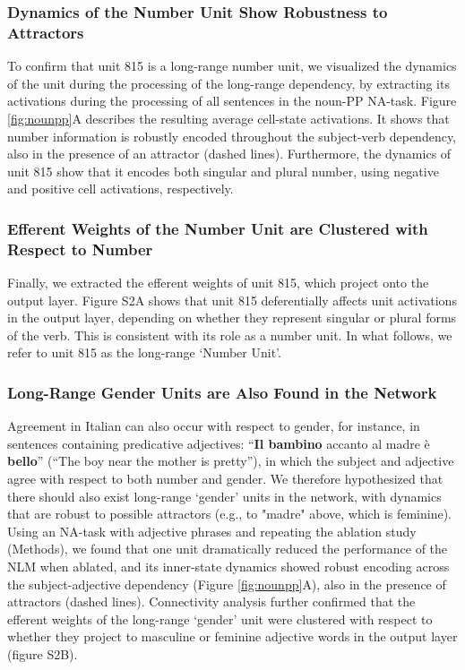 \subsubsection{Dynamics of the Number Unit Show Robustness to Attractors} 
To confirm that unit 815 is a long-range number unit, we visualized the dynamics of the unit during the processing of the long-range dependency, by extracting its activations during the processing of all sentences in the noun-PP NA-task. Figure \ref{fig:nounpp}A describes the resulting average cell-state activations. It shows that number information is robustly encoded throughout the subject-verb dependency, also in the presence of an attractor (dashed lines). Furthermore, the dynamics of unit 815 show that it encodes both singular and plural number, using negative and positive cell activations, respectively. 

\subsubsection{Efferent Weights of the Number Unit are Clustered with Respect to Number}
Finally, we extracted the efferent weights of unit 815, which project onto the output layer. Figure S2A shows that unit 815 deferentially affects unit activations in the output layer, depending on whether they represent singular or plural forms of the verb. This is consistent with its role as a number unit. In what follows, we refer to unit 815 as the long-range `Number Unit'.

\subsubsection{Long-Range Gender Units are Also Found in the Network }
Agreement in Italian can also occur with respect to gender, for instance, in sentences containing predicative adjectives: ``\textbf{Il bambino} accanto al madre \`{e} \textbf{bello}'' (``The boy near the mother is pretty''), in which the subject and adjective agree with respect to both number and gender. We therefore hypothesized that there should also exist long-range `gender' units in the network, with dynamics that are robust to possible attractors (e.g., to "madre" above, which is feminine). Using an NA-task with adjective phrases and repeating the ablation study (Methods), we found that one unit dramatically reduced the performance of the NLM when ablated, and its inner-state dynamics showed robust encoding across the subject-adjective dependency (Figure \ref{fig:nounpp}A), also in the presence of attractors (dashed lines). Connectivity analysis further confirmed that the efferent weights of the long-range `gender' unit were clustered with respect to whether they project to masculine or feminine adjective words in the output layer (figure S2B).

